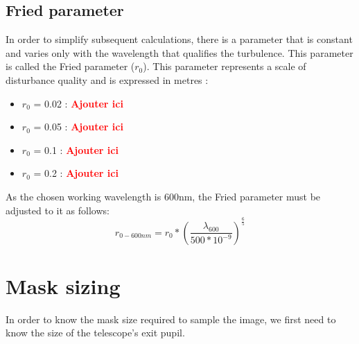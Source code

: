 \subsection{Fried parameter}
In order to simplify subsequent calculations, there is a parameter that is constant and varies only with the wavelength that qualifies the turbulence.
This parameter is called the Fried parameter ($r_0$).
This parameter represents a scale of disturbance quality and is expressed in metres :
\begin{itemize}
    \item $r_0$ = 0.02 : \textbf{\textcolor{red}{Ajouter ici}}
    \item $r_0$ = 0.05 : \textbf{\textcolor{red}{Ajouter ici}}
    \item $r_0$ = 0.1 : \textbf{\textcolor{red}{Ajouter ici}}
    \item $r_0$ = 0.2 : \textbf{\textcolor{red}{Ajouter ici}}
\end{itemize}
As the chosen working wavelength is 600nm, the Fried parameter must be adjusted to it as follows:
\begin{equation}
    r_{0-600nm} = r_0*\left(\frac{\lambda_{600}}{500*10^{-9}}\right)^{\frac{6}{5}}
\end{equation}
\newpage
\section{Mask sizing}\label{sec:Opti_Couille}
In order to know the mask size required to sample the image, we first need to know the size of the telescope's exit pupil.
